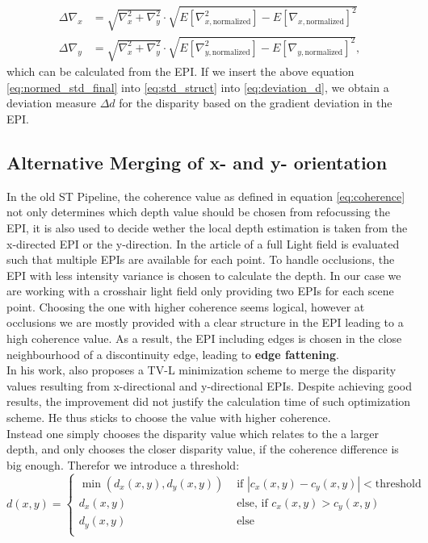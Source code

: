 \documentclass  [
  paper    = a4,
  BCOR     = 10mm,
  twoside,
  fontsize = 12pt,
  fleqn,
  toc      = bibnumbered,
  toc      = listofnumbered,
  numbers  = noendperiod,
  headings = normal,
  listof   = leveldown,
  version  = 3.03
]                                       {scrreprt}
\begin{document}
 \begin{align}\label{eq:normed_std_final}
 \Delta\nabla_{x} &=  \sqrt{\nabla_x^2 + \nabla_y^2} \cdot \sqrt{E[\nabla_{x, \text{normalized}}^2] - E[\nabla_{x, \text{normalized}}]^2}\\
 \Delta\nabla_{y} &= \sqrt{\nabla_x^2 + \nabla_y^2} \cdot \sqrt{E[\nabla_{y, \text{normalized}}^2] - E[\nabla_{y, \text{normalized}}]^2},
 \end{align}
 which can be calculated from the EPI.
 If we insert the above equation \ref{eq:normed_std_final} into \ref{eq:std_struct} into \ref{eq:deviation_d}, we obtain a deviation measure $\Delta d$ for the disparity based on the gradient deviation in the EPI.
 
 \subsection{Alternative Merging of x- and y- orientation}
 In the old ST Pipeline, the coherence value as defined in equation \ref{eq:coherence} not only determines which depth value should be chosen from refocussing the EPI, it is also used to decide wether the local depth estimation is taken from the x-directed EPI or the y-direction. In the article of \cite{sheng2018occlusion} a full Light field is evaluated such that multiple EPIs are available for each point. To handle occlusions, the EPI with less intensity variance is chosen to calculate the depth. In our case we are working with a crosshair light field only providing two EPIs for each scene point. Choosing the one with higher coherence seems logical, however at occlusions we are mostly provided with a clear structure in the EPI leading to a high coherence value. As a result, the EPI including edges is chosen in the close neighbourhood of a discontinuity edge, leading to \textbf{edge fattening}.\\
 In his work, \cite{wanner2014orientation} also proposes a TV-L minimization scheme to merge the disparity values resulting from x-directional and y-directional EPIs. Despite achieving good results, the improvement did not justify the calculation time of such optimization scheme. He thus sticks to choose the value with higher coherence.\\
 Instead one simply chooses the disparity value which relates to the a larger depth, and only chooses the closer disparity value, if the coherence difference is big enough. Therefor we introduce a threshold:
 \begin{equation}\label{eq:altmerging}
 d(x,y) = \begin{cases}
 \min(d_x(x,y),d_y(x,y))&\text{ if } |c_x(x,y)-c_y(x,y)|<\text{threshold} \\
  d_x(x,y)&\text{ else, if } c_x(x,y)> c_y(x,y)\\
  d_y(x,y)&\text{ else}\\
  \end{cases}
   \end{equation}
\end{document}
